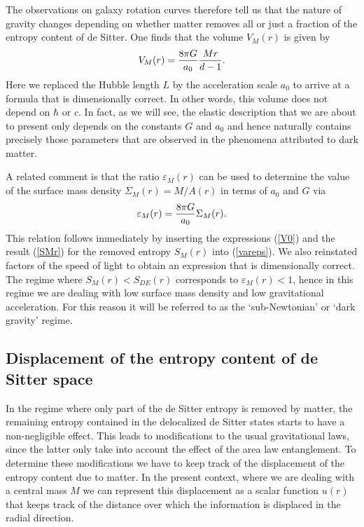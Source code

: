 \documentclass[a4paper,12pt]{article}
\begin{document}
The observations on galaxy rotation curves therefore tell us that the nature of gravity changes depending on whether matter removes all or just a fraction of the entropy content of de Sitter.
One finds that the volume $V_M(r)$ is given by
\begin{equation}
\label{VMr}
V_M(r) = {8\pi G \over a_0} {M r\over d-1} 	.
\end{equation}
Here we replaced the Hubble length $L$ by the acceleration scale $a_0$ to arrive at a formula that is dimensionally correct. In other words, this volume does not depend on $\hbar$ or $c$. In fact, as we will see, the elastic description that we are about to present only depends on the constants $G$ and $a_0$ and hence naturally contains precisely those parameters that are observed in the phenomena attributed to dark matter. 

A related comment is that the ratio $\varepsilon_M(r)$ can be used to determine the value of the surface mass density $\Sigma_M(r) =M/A(r)$ in terms of $a_0$ and $G$ via
\begin{equation}
\label{Sigmaeps}
\varepsilon_M (r)	= {8\pi G\over a_0}   
 \Sigma_M(r) . %
\end{equation}
This relation follows immediately by inserting the expressions (\ref{V0}) and the result 
(\ref{SMr}) for the removed entropy $S_M(r)$  into (\ref{vareps}). We also reinstated factors of the speed of light to obtain an expression that is dimensionally correct.  
 The regime where $S_M(r)< S_{DE}(r)$ corresponds to $\varepsilon_M(r) <1$, hence in this regime we 
 are dealing with low surface mass density and low gravitational acceleration.  
For this reason it will be referred to as the `sub-Newtonian' or `dark gravity' regime. 
 
 
 
  
 \subsection{Displacement of the entropy content of de Sitter space}
 
In the regime where only part of the de Sitter entropy is removed by matter, the remaining entropy contained in the delocalized de Sitter states starts to have a non-negligible effect. This leads to modifications to the usual gravitational laws, since the latter only take into account the effect of the area law entanglement. To determine these modifications we have to keep track of the displacement of the entropy content due to matter.  In the present context, where we are dealing with a central mass $M$ we can represent this displacement as a scalar function $u(r)$ that keeps track of the distance over which the 
information is displaced in the radial direction. 
\end{document}
